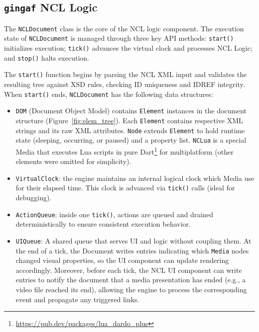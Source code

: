 \documentclass[sigconf]{acmart}
\newcommand{\projectname}{\texttt{gingaf}}
\begin{document}
\subsection{\projectname{} NCL Logic}
\label{sec:ncllogic}

The \texttt{NCLDocument} class is the core of the NCL logic component. The execution state of \texttt{NCLDocument} is managed through three key API methods: \texttt{start()} initializes execution; \texttt{tick()} advances the virtual clock and processes NCL Logic; and \texttt{stop()} halts execution.

The \texttt{start()} function begins by parsing the NCL XML input and validates the resulting tree against XSD rules, checking ID uniqueness and IDREF integrity. When \texttt{start()} ends, \texttt{NCLDocument} has the following data structures:
\begin{itemize}
  \item \texttt{DOM} (Document Object Model) contains \texttt{Element} instances in the document structure (Figure~\ref{fig:elem_tree}). Each \texttt{Element} contains respective XML strings and its raw XML attributes. \texttt{Node} extends \texttt{Element} to hold runtime state (sleeping, occurring, or paused) and a property list. \texttt{NCLua} is a special Media that executes Lua scripts in pure Dart\footnote{\url{https://pub.dev/packages/lua_dardo_plus}} for multiplatform (other elements were omitted for simplicity).
  \item \texttt{VirtualClock}: the engine maintains an internal logical clock which Media use for their elapsed time. This clock is advanced via \texttt{tick()} calls (ideal for debugging).
  \item \texttt{ActionQueue}: inside one \texttt{tick()}, actions are queued and drained deterministically to ensure consistent execution behavior.
  \item \texttt{UIQueue}: A shared queue that serves UI and logic without coupling them. At the end of a tick, the Document writes entries indicating which \texttt{Media} nodes changed visual properties, so the UI component can update rendering accordingly. Moreover, before each tick, the NCL UI component can write entries to notify the document that a media presentation has ended (e.g., a video file reached its end), allowing the engine to process the corresponding event and propagate any triggered links.
\end{itemize}
\end{document}
